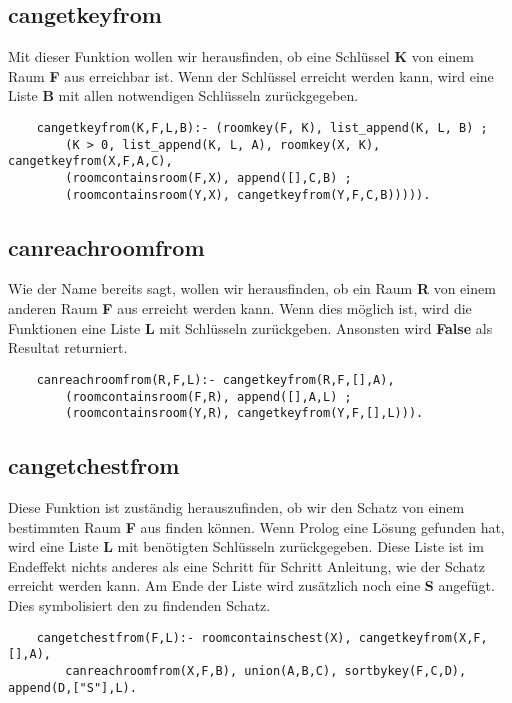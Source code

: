 \subsection{cangetkeyfrom}
Mit dieser Funktion wollen wir herausfinden, ob eine Schlüssel \textbf{K} von einem 
Raum \textbf{F} aus erreichbar ist. Wenn der Schlüssel erreicht werden kann, wird eine Liste \textbf{B}
mit allen notwendigen Schlüsseln zurückgegeben.

\begin{verbatim}
    cangetkeyfrom(K,F,L,B):- (roomkey(F, K), list_append(K, L, B) ; 
        (K > 0, list_append(K, L, A), roomkey(X, K), cangetkeyfrom(X,F,A,C), 
        (roomcontainsroom(F,X), append([],C,B) ; 
        (roomcontainsroom(Y,X), cangetkeyfrom(Y,F,C,B))))).
\end{verbatim}

\subsection{canreachroomfrom}
Wie der Name bereits sagt, wollen wir herausfinden, ob ein Raum \textbf{R} von einem
anderen Raum \textbf{F} aus erreicht werden kann. Wenn dies möglich ist, wird die Funktionen
eine Liste \textbf{L} mit Schlüsseln zurückgeben. Ansonsten wird \textbf{False} als Resultat returniert.

\begin{verbatim}
    canreachroomfrom(R,F,L):- cangetkeyfrom(R,F,[],A), 
        (roomcontainsroom(F,R), append([],A,L) ; 
        (roomcontainsroom(Y,R), cangetkeyfrom(Y,F,[],L))).
\end{verbatim}

\subsection{cangetchestfrom}
Diese Funktion ist zuständig herauszufinden, ob wir den Schatz von einem bestimmten
Raum \textbf{F} aus finden können. Wenn Prolog eine Lösung gefunden hat, wird eine
Liste \textbf{L} mit benötigten Schlüsseln zurückgegeben. Diese Liste ist im Endeffekt
nichts anderes als eine Schritt für Schritt Anleitung, wie der Schatz erreicht werden 
kann. Am Ende der Liste wird zusätzlich noch eine \textbf{S} angefügt. Dies symbolisiert 
den zu findenden Schatz.

\begin{verbatim}
    cangetchestfrom(F,L):- roomcontainschest(X), cangetkeyfrom(X,F,[],A),
        canreachroomfrom(X,F,B), union(A,B,C), sortbykey(F,C,D), append(D,["S"],L).
\end{verbatim}

